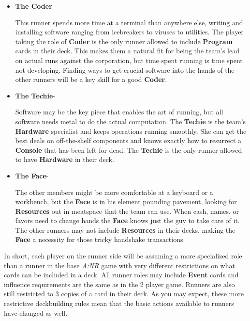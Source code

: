 \documentclass[titlepage]{article}
\begin{document}
			\begin{itemize}

				\item \textbf{The Coder}-

					This runner spends more time at a terminal than anywhere else, writing and installing software ranging from icebreakers to viruses to utilities. The player taking the role of \textbf{Coder} is the only runner allowed to include \textbf{Program} cards in their deck. This makes them a natural fit for being the team's lead on actual runs against the corporation, but time spent running is time spent not developing. Finding ways to get crucial software into the hands of the other runners will be a key skill for a good \textbf{Coder}.

				\item \textbf{The Techie}-

					Software may be the key piece that enables the art of running, but all software needs metal to do the actual computation. The \textbf{Techie} is the team's \textbf{Hardware} specialist and keeps operations running smoothly. She can get the best deals on off-the-shelf components and knows exactly how to resurrect a \textbf{Console} that has been left for dead. The \textbf{Techie} is the only runner allowed to have \textbf{Hardware} in their deck.

				\item \textbf{The Face}-

					The other members might be more comfortable at a keyboard or a workbench, but the \textbf{Face} is in his element pounding pavement, looking for \textbf{Resources} out in meatspace that the team can use. When cash, names, or favors need to change hands the \textbf{Face} knows just the guy to take care of it. The other runners may not include \textbf{Resources} in their decks, making the \textbf{Face} a necessity for those tricky handshake transactions.

			\end{itemize}

				In short, each player on the runner side will be assuming a more specialized role than a runner in the base \emph{A:NR} game with very different restrictions on what cards can be included in a deck. All runner roles may include \textbf{Event} cards and influence requirements are the same as in the 2 player game. Runners are also still restricted to 3 copies of a card in their deck. As you may expect, these more restrictive deckbuilding rules mean that the basic actions available to runners have changed as well.
\end{document}
